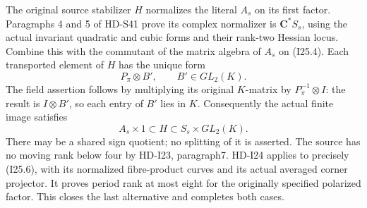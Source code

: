 The original source stabilizer \(H\) normalizes the literal
\(A_s\) on its first factor. Paragraphs 4 and 5 of HD-S41
prove its complex normalizer is \(\mathbf C^*S_s\), using
the actual invariant quadratic and cubic forms and their
rank-two Hessian locus. Combine this with the commutant of
the matrix algebra of \(A_s\) on (I25.4). Each transported
element of \(H\) has the unique form
\[
                               P_\pi\otimes B',\qquad B'\in GL_2(K).
                                                               \tag{I25.5}
\]
The field assertion follows by multiplying its original
\(K\)-matrix by \(P_\pi^{-1}\otimes I\): the result
is \(I\otimes B'\), so each entry of \(B'\) lies in
\(K\). Consequently the actual finite image satisfies
\[
                    A_s\times1\subset H\subset S_s\times GL_2(K).
                                                               \tag{I25.6}
\]
There may be a shared sign quotient; no splitting of it is
asserted. The source has no moving rank below four by
HD-I23, paragraph7. HD-I24 applies to precisely (I25.6),
with its normalized fibre-product curves and its actual
averaged corner projector. It proves period rank at most
eight for the originally specified polarized factor.
This closes the last alternative and completes both cases.
